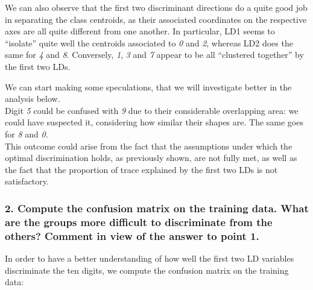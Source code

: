 \documentclass[
  letterpaper,
  DIV=11,
  numbers=noendperiod]{scrartcl}
\newenvironment{Shaded}{\begin{snugshade}}{\end{snugshade}}
\newcommand{\AttributeTok}[1]{\textcolor[rgb]{0.40,0.45,0.13}{#1}}
\newcommand{\FunctionTok}[1]{\textcolor[rgb]{0.28,0.35,0.67}{#1}}
\newcommand{\NormalTok}[1]{\textcolor[rgb]{0.00,0.23,0.31}{#1}}
\newcommand{\OtherTok}[1]{\textcolor[rgb]{0.00,0.23,0.31}{#1}}
\newcommand{\SpecialCharTok}[1]{\textcolor[rgb]{0.37,0.37,0.37}{#1}}
\begin{document}
We can also observe that the first two discriminant directions do a
quite good job in separating the class centroids, as their associated
coordinates on the respective axes are all quite different from one
another. In particular, LD1 seems to ``isolate'' quite well the
centroids associated to \emph{0} and \emph{2}, whereas LD2 does the same
for \emph{4} and \emph{8}. Conversely, \emph{1}, \emph{3} and \emph{7}
appear to be all ``clustered together'' by the first two LDs.

We can start making some speculations, that we will investigate better
in the analysis below.\\
Digit \emph{5} could be confused with \emph{9} due to their considerable
overlapping area: we could have suspected it, considering how similar
their shapes are. The same goes for \emph{8} and \emph{0}.\\
This outcome could arise from the fact that the assumptions under which
the optimal discrimination holds, as previously shown, are not fully
met, as well as the fact that the proportion of trace explained by the
first two LDs is not satisfactory.

\hypertarget{compute-the-confusion-matrix-on-the-training-data.-what-are-the-groups-more-difficult-to-discriminate-from-the-others-comment-in-view-of-the-answer-to-point-1.}{%
\subsubsection{2. Compute the confusion matrix on the training data.
What are the groups more difficult to discriminate from the others?
Comment in view of the answer to point
1.}\label{compute-the-confusion-matrix-on-the-training-data.-what-are-the-groups-more-difficult-to-discriminate-from-the-others-comment-in-view-of-the-answer-to-point-1.}}

In order to have a better understanding of how well the first two LD
variables discriminate the ten digits, we compute the confusion matrix
on the training data:

\begin{Shaded}
\end{Shaded}
\end{document}
